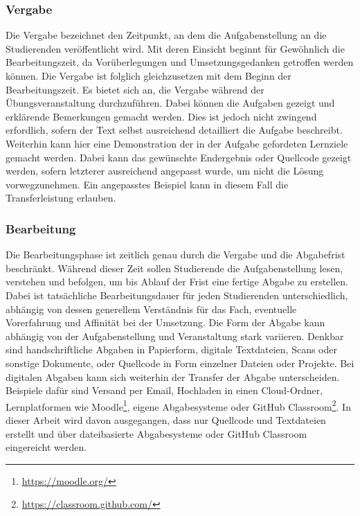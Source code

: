 \subsubsection{Vergabe}

Die Vergabe bezeichnet den Zeitpunkt, an dem die Aufgabenstellung an die Studierenden veröffentlicht wird.
Mit deren Einsicht beginnt für Gewöhnlich die Bearbeitungszeit, da Vorüberlegungen und Umsetzungsgedanken getroffen werden können.
Die Vergabe ist folglich gleichzusetzen mit dem Beginn der Bearbeitungszeit.
Es bietet sich an, die Vergabe während der Übungsveranstaltung durchzuführen.
Dabei können die Aufgaben gezeigt und erklärende Bemerkungen gemacht werden.
Dies ist jedoch nicht zwingend erfordlich, sofern der Text selbst ausreichend detailliert die Aufgabe beschreibt.
Weiterhin kann hier eine Demonstration der in der Aufgabe gefordeten Lernziele gemacht werden.
Dabei kann das gewünschte Endergebnis oder Quellcode gezeigt werden, sofern letzterer ausreichend angepasst wurde, um nicht die Lösung vorwegzunehmen.
Ein angepasstes Beispiel kann in diesem Fall die Transferleistung erlauben.

\subsubsection{Bearbeitung}

Die Bearbeitungsphase ist zeitlich genau durch die Vergabe und die Abgabefrist beschränkt.
Während dieser Zeit sollen Studierende die Aufgabenstellung lesen, verstehen und befolgen, um bis Ablauf der Frist eine fertige Abgabe zu erstellen.
Dabei ist tatsächliche Bearbeitungsdauer für jeden Studierenden unterschiedlich, abhängig von dessen generellem Verständnis für das Fach, eventuelle Vorerfahrung und Affinität bei der Umsetzung.
Die Form der Abgabe kann abhängig von der Aufgabenstellung und Veranstaltung stark variieren.
Denkbar sind handschriftliche Abgaben in Papierform, digitale Textdateien, Scans oder sonstige Dokumente, oder Quellcode in Form einzelner Dateien oder Projekte.
Bei digitalen Abgaben kann sich weiterhin der Transfer der Abgabe unterscheiden.
Beispiele dafür sind Versand per Email, Hochladen in einen Cloud-Ordner, Lernplatformen wie Moodle\footnote{\url{https://moodle.org/}}, eigene Abgabesysteme oder GitHub Classroom\footnote{\url{https://classroom.github.com/}}.
In dieser Arbeit wird davon ausgegangen, dass nur Quellcode und Textdateien erstellt und über dateibasierte Abgabesysteme oder GitHub Classroom eingereicht werden.

